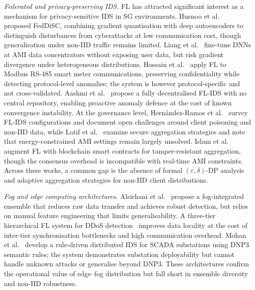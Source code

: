 \documentclass[sensors,article,submit,pdftex,moreauthors]{Definitions/mdpi}
\begin{document}
\noindent\textit{Federated and privacy-preserving IDS.} FL has attracted significant interest as a mechanism for privacy-sensitive IDS in SG environments. Husnoo et al.~\cite{husnoo2023feddisc} proposed FedDiSC, combining gradient quantisation with deep autoencoders to distinguish disturbances from cyberattacks at low communication cost, though generalisation under non-IID traffic remains limited. Liang et al.~\cite{liang2023intrusion} fine-tune DNNs at AMI data concentrators without exposing user data, but risk gradient divergence under heterogeneous distributions. Hossain et al.~\cite{hossain2023modbus} apply FL to Modbus RS-485 smart meter communications, preserving confidentiality while detecting protocol-level anomalies; the system is however protocol-specific and not cross-validated. Aashmi et al.~\cite{aashmi2023federated} propose a fully decentralised FL-IDS with no central repository, enabling proactive anomaly defence at the cost of known convergence instability. At the governance level, Hernández-Ramos et al.~\cite{HernandezRamos2024} survey FL-IDS configurations and document open challenges around client poisoning and non-IID data, while Latif et al.~\cite{Latif2025} examine secure aggregation strategies and note that energy-constrained AMI settings remain largely unsolved. Islam et al.~\cite{blockchain_sg_2024} augment FL with blockchain smart contracts for tamper-resistant aggregation, though the consensus overhead is incompatible with real-time AMI constraints. Across these works, a common gap is the absence of formal $(\varepsilon,\delta)$-DP analysis and adaptive aggregation strategies for non-IID client distributions.

\noindent\textit{Fog and edge computing architectures.} Alsirhani et al.~\cite{Alsirhani2025} propose a fog-integrated ensemble that reduces raw data transfer and achieves robust detection, but relies on manual feature engineering that limits generalisability. A three-tier hierarchical FL system for DDoS detection~\cite{SpringerOpen2024} improves data locality at the cost of inter-tier synchronisation bottlenecks and high communication overhead. Mohan et al.~\cite{Mohan2024} develop a rule-driven distributed IDS for SCADA substations using DNP3 semantic rules; the system demonstrates substation deployability but cannot handle unknown attacks or generalise beyond DNP3. These architectures confirm the operational value of edge--fog distribution but fall short in ensemble diversity and non-IID robustness.
\end{document}
